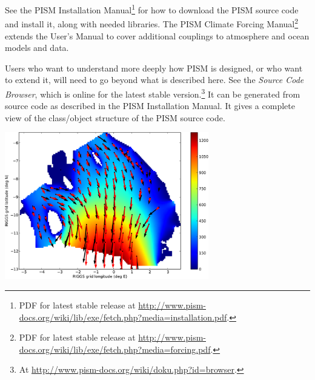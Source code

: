 \documentclass[titlepage,letterpaper,final]{scrartcl}
\begin{document}
See the PISM Installation Manual\footnote{PDF for latest stable release at \url{http://www.pism-docs.org/wiki/lib/exe/fetch.php?media=installation.pdf}.}
for how to download the PISM source code and install
it, along with needed libraries.  The PISM Climate Forcing
Manual\footnote{PDF for latest stable release at \url{http://www.pism-docs.org/wiki/lib/exe/fetch.php?media=forcing.pdf}.}
extends the User's Manual to cover additional couplings to atmosphere and ocean
models and data.

Users who want to understand more deeply how PISM is designed, or who want to extend it,  will need to go beyond what is described here.  See the \emph{Source Code Browser}, which is online for the latest stable version.\footnote{At \url{http://www.pism-docs.org/wiki/doku.php?id=browser}.}  It can be generated from source code as described in the PISM Installation Manual.  It gives a complete view of the class/object structure of the PISM source code.


\vspace{.3in}
  
\begin{center}
\includegraphics[width=3.5in,keepaspectratio=true]{rossquiver}
\end{center}

\vspace{.2in}

\begin{center}
\end{center}
\end{document}
